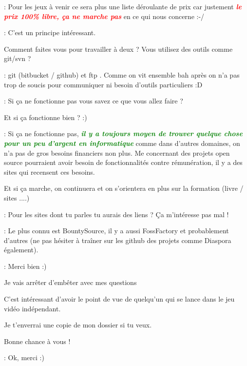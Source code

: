 \documentclass[a4paper,12pt, draft]{report}
\newcommand{\goodPoint}[1]{\textcolor{green}{\textbf{\textit{#1}}}}
\newcommand{\badPoint}[1]{\textcolor{red}{\textbf{\textit{#1}}}}
\begin{document}
\begin{description}
\item 
\item [Réponse]: Pour les jeux à venir ce sera plus une liste déroulante de prix car justement \badPoint{le prix 100\% libre, ça ne marche pas} en ce qui nous concerne :-/
\item 
\item [Question]: C'est un principe intéressant.
\item Comment faites vous pour travailler à deux ? Vous utilisez des outils comme git/svn ?
\item 
\item [Réponse]: git (bitbucket / github) et ftp  . Comme on vit ensemble bah après on n'a pas trop de soucis pour communiquer ni besoin d'outils particuliers :D
\item 
\item [Question]: Si ça ne fonctionne pas vous savez ce que vous allez faire ?
\item Et si ça fonctionne bien ? :)
\item 
\item [Réponse]: Si ça ne fonctionne pas, \goodPoint{il y a toujours moyen de trouver quelque chose pour un peu d'argent en informatique} comme dans d'autres domaines, on n'a pas de gros besoins financiers non plus. Me concernant des projets open source pourraient avoir besoin de fonctionnalités contre rémunération, il y a des sites qui recensent ces besoins.
\item Et si ça marche, on continuera et on s'orientera en plus sur la formation (livre / sites ....)
\item 
\item [Question]: Pour les sites dont tu parles tu aurais des liens ? Ça m'intéresse pas mal !
\item 
\item [Réponse]: Le plus connu est BountySource\cite{bountySource}, il y a aussi FossFactory\cite{fossfactory} et probablement d'autres (ne pas hésiter à traîner sur les github des projets comme Diaspora également).
\item 
\item [Question]: Merci bien :)
\item Je vais arrêter d'embêter avec mes questions  
\item C'est intéressant d'avoir le point de vue de quelqu'un qui se lance dans le jeu vidéo indépendant.
\item Je t'enverrai une copie de mon dossier si tu veux.
\item Bonne chance à vous !
\item 
\item [Réponse]: Ok, merci :)

\end{description}
\end{document}
